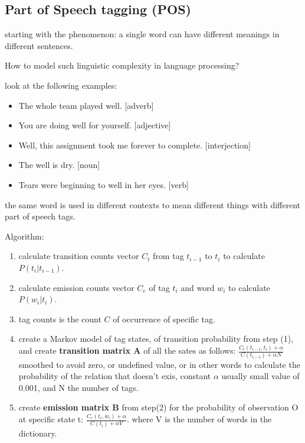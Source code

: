 \documentclass[4apaper,12pt]{book}
\begin{document}
\begin{description}
    \subsection {Part of Speech tagging (POS)}
  \item starting with the phenomenon: a single word can have different meanings in different sentences.
  \item How to model such linguistic complexity in language processing?
  \item look at the following examples: \begin{itemize}
    \item The whole team played well. [adverb]
    \item You are doing well for yourself. [adjective]
    \item Well, this assignment took me forever to complete. [interjection]
    \item The well is dry. [noun]
    \item Tears were beginning to well in her eyes. [verb]
  \end{itemize}
  \item the same word is used in different contexts to mean different things with different part of speech tags.

  \item Algorithm:
    \begin{enumerate}

    \item calculate transition counts vector $C_t$ from tag $t_{i-1}$ to $t_i$ to calculate $P(t_i|t_{i-1})$.

    \item calculate emission counts vector $C_e$ of tag $t_i$ and word $w_i$ to calculate $P(w_i|t_i)$.

    \item tag counts is the count $C$ of occurrence of specific tag.

    \item create a Markov model of tag states, of transition probability from step (1), and create \textbf{transition matrix A} of all the sates as follows: $\frac{C_t(t_{i-1},t_i) + \alpha}{C(t_{i-1}) + \alpha N}$ smoothed to avoid zero, or undefined value, or in other words to calculate the probability of the relation that doesn't exis, constant $\alpha$ usually small value of 0.001, and N the number of tags.

    \item create \textbf{emission matrix B} from step(2) for the probability of observation O at specific state t:  $\frac{C_e(t_i, w_i) + \alpha}{C(t_i) + \alpha V}$. where V is the number of words in the dictionary.


\end{enumerate}
\end{description}
\end{document}
